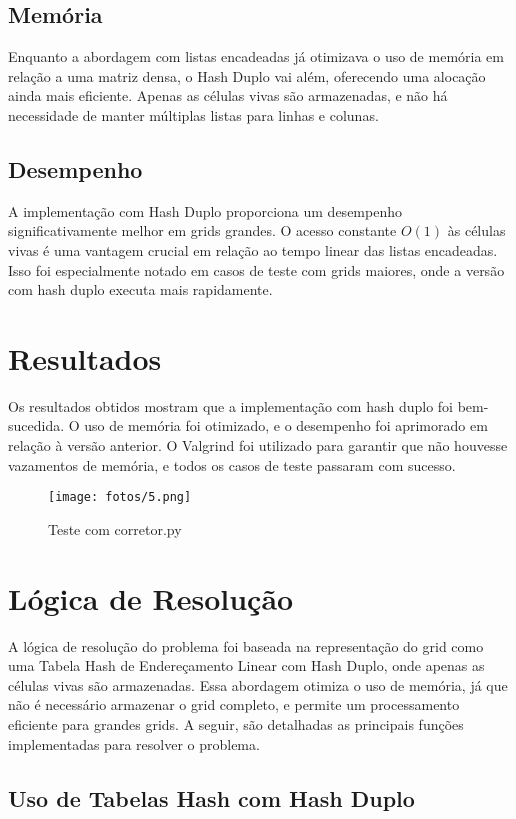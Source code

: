 \documentclass[a4paper,12pt]{article}
\begin{document}
\subsection{Memória}
Enquanto a abordagem com listas encadeadas já otimizava o uso de memória em relação a uma matriz densa, o Hash Duplo vai além, oferecendo uma alocação ainda mais eficiente. Apenas as células vivas são armazenadas, e não há necessidade de manter múltiplas listas para linhas e colunas.

\subsection{Desempenho}
A implementação com Hash Duplo proporciona um desempenho significativamente melhor em grids grandes. O acesso constante \(O(1)\) às células vivas é uma vantagem crucial em relação ao tempo linear das listas encadeadas. Isso foi especialmente notado em casos de teste com grids maiores, onde a versão com hash duplo executa mais rapidamente.

\section{Resultados}
Os resultados obtidos mostram que a implementação com hash duplo foi bem-sucedida. O uso de memória foi otimizado, e o desempenho foi aprimorado em relação à versão anterior. O Valgrind foi utilizado para garantir que não houvesse vazamentos de memória, e todos os casos de teste passaram com sucesso.

\begin{figure}[H]
    \centering
    \texttt{[image: fotos/5.png]}
    \caption{Teste com corretor.py}
\end{figure}
\section{Lógica de Resolução}

A lógica de resolução do problema foi baseada na representação do grid como uma Tabela Hash de Endereçamento Linear com Hash Duplo, onde apenas as células vivas são armazenadas. Essa abordagem otimiza o uso de memória, já que não é necessário armazenar o grid completo, e permite um processamento eficiente para grandes grids. A seguir, são detalhadas as principais funções implementadas para resolver o problema.

\subsection{Uso de Tabelas Hash com Hash Duplo}
\end{document}
